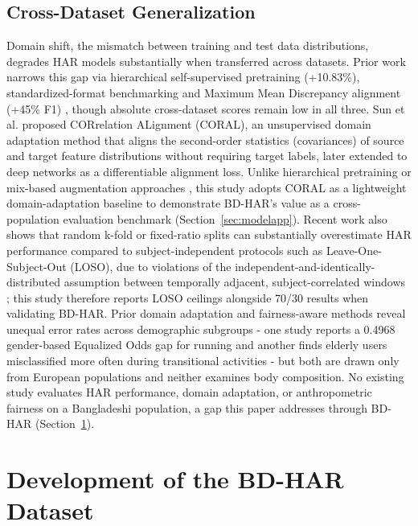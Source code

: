 \documentclass[conference]{IEEEtran}
\begin{document}
\subsection{Cross-Dataset Generalization}
\label{subsec:crossdataset}
Domain shift, the mismatch between training and test data
distributions, degrades HAR models substantially when transferred
across datasets. Prior work narrows this gap via hierarchical self-supervised pretraining (+10.83\%)\cite{hong_crosshar_2024}, standardized-format benchmarking \cite{napoli_benchmark_2024} and Maximum Mean Discrepancy alignment (+45\% F1) \cite{kasim_cross_domain_2023}, though absolute cross-dataset scores remain low in all three. Sun et al.
\cite{sun_return_2016, sun_correlation_2017} proposed CORrelation
ALignment (CORAL), an unsupervised domain adaptation method that
aligns the second-order statistics (covariances) of source and target
feature distributions without requiring target labels, later extended
to deep networks as a differentiable alignment loss. Unlike
hierarchical pretraining or mix-based augmentation approaches
\cite{hong_crosshar_2024, napoli_domain_2025}, this study adopts CORAL
\cite{sun_return_2016, sun_correlation_2017} as a lightweight
domain-adaptation baseline to demonstrate BD-HAR's value as a
cross-population evaluation benchmark (Section~\ref{sec:modelapp}).
Recent work also shows that random k-fold or fixed-ratio splits can
substantially overestimate HAR performance compared to
subject-independent protocols such as Leave-One-Subject-Out (LOSO),
due to violations of the independent-and-identically-distributed
assumption between temporally adjacent, subject-correlated windows
\cite{tello_too_2023, pang_stacked_2022}; this study therefore reports
LOSO ceilings alongside 70/30 results when validating BD-HAR. Prior
domain adaptation and fairness-aware methods reveal unequal error
rates across demographic subgroups - one study reports a 0.4968
gender-based Equalized Odds gap for running \cite{roy_fairness_2023}
and another finds elderly users misclassified more often during
transitional activities \cite{martins_elderhar_2026} - but both are
drawn only from European populations and neither examines body
composition. No existing study evaluates HAR performance, domain
adaptation, or anthropometric fairness on a Bangladeshi population, a
gap this paper addresses through BD-HAR (Section~\ref{sec:dataset}).

\section{Development of the BD-HAR Dataset}
\label{sec:dataset}
\end{document}
